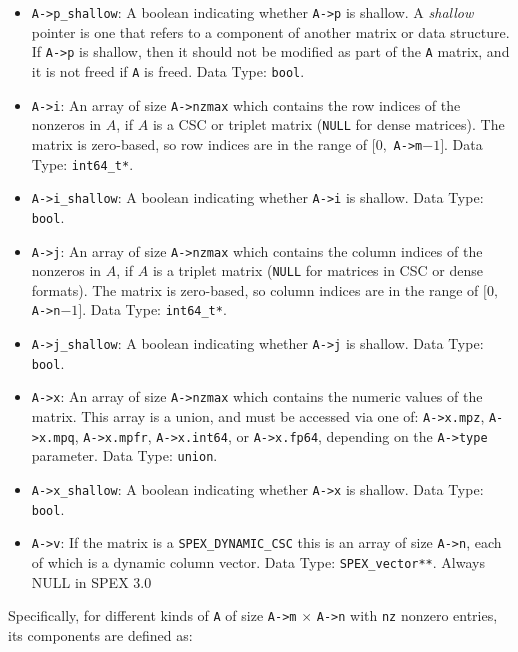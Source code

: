 \documentclass[12pt,oneside]{book}
\theoremstyle{definition}
\begin{document}
\begin{itemize}
    \item \verb|A->p_shallow|: A boolean indicating whether \verb|A->p| is shallow. A {\em shallow} pointer is one that refers to a component of another matrix or data structure.  If \verb|A->p| is shallow, then it should not be modified as part of the \verb|A| matrix, and it is not freed if \verb|A| is freed. Data Type: \verb|bool|.

    \item \verb|A->i|: An array of size \verb|A->nzmax| which contains the row indices of the nonzeros in $A$, if $A$ is a CSC or triplet matrix (\verb|NULL| for dense matrices). The matrix is zero-based, so row indices are in the range of $[0,$ \verb|A->m|$-1]$. Data Type: \verb|int64_t*|.

    \item \verb|A->i_shallow|: A boolean indicating whether \verb|A->i| is shallow. Data Type: \verb|bool|.

    \item \verb|A->j|: An array of size \verb|A->nzmax| which contains the column indices of the nonzeros in $A$, if $A$ is a triplet matrix (\verb|NULL| for matrices in CSC or dense formats). The matrix is zero-based, so column indices are in the range of $[0,$ \verb|A->n|$-1]$. Data Type: \verb|int64_t*|.

    \item \verb|A->j_shallow|: A boolean indicating whether \verb|A->j| is shallow. Data Type: \verb|bool|.

    \item \verb|A->x|: An array of size \verb|A->nzmax| which contains the numeric values of the matrix.  This array is a union, and must be accessed via one of: \verb|A->x.mpz|, \verb|A->x.mpq|, \verb|A->x.mpfr|, \verb|A->x.int64|, or \verb|A->x.fp64|, depending on the \verb|A->type| parameter. Data Type: \verb|union|.

    \item \verb|A->x_shallow|: A boolean indicating whether \verb|A->x| is shallow. Data Type: \verb|bool|.

    \item \verb|A->v|: If the matrix is a \verb|SPEX_DYNAMIC_CSC| this is an array of size \verb|A->n|, each of which is a dynamic column vector. Data Type: \verb|SPEX_vector**|. Always NULL in SPEX 3.0
\end{itemize}

Specifically, for different kinds of \verb|A| of size \verb|A->m| $\times$ \verb|A->n|
with \verb|nz| nonzero entries, its components are defined as:
\end{document}
